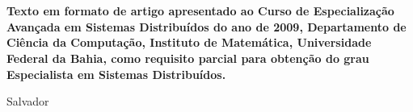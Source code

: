 

\begin{titlepage}
 \vfill
 \begin{center}
   {\large \uppercase{ \bf{ \meunome\ } } } \\[7cm]
   {\Huge \uppercase{ \bf{ \meutitulo\ } } }\\[1cm]
   \vfill
   \hspace{.45\textwidth} %
   \begin{minipage}{.5\textwidth}
       \bf{
	Texto em formato de artigo apresentado ao Curso de Especialização Avançada em Sistemas Distribuídos do ano de 2009, Departamento de Ciência da Computação, 
	Instituto de Matemática, Universidade Federal da Bahia, como requisito parcial para obtenção do grau Especialista em Sistemas Distribuídos. \\ 
       }      
       \meuorientador
   \end{minipage}
   \vfill
   Salvador \\
   \meuano
 \end{center}
\end{titlepage}

